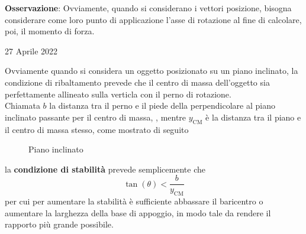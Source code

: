 \documentclass[a4paper]{extarticle}
\begin{document}
\vspace{1em}
\noindent
\textbf{Osservazione}: Ovviamente, quando si considerano i vettori posizione, bisogna considerare come loro punto di applicazione l'asse di rotazione al fine di calcolare, poi, il momento di forza.

\newpage
\noindent
\begin{center}
  27 Aprile 2022
\end{center}
Ovviamente quando si considera un oggetto posizionato su un piano inclinato, la condizione di ribaltamento prevede che il centro di massa dell'oggetto sia perfettamente allineato sulla verticla con il perno di rotazione.\\
Chiamata $b$ la distanza tra il perno e il piede della perpendicolare al piano inclinato passante per il centro di massa, , mentre $y_{\text{CM}}$ è la distanza tra il piano e il centro di massa stesso, come mostrato di seguito

\vspace{1em}
\noindent
\begin{figure}[H]
  \centering
  \newcommand{\ang}{30}

  \caption{Piano inclinato}
  \label{fig:piano_inclinato_1}
\end{figure}

\noindent
la \textbf{condizione di stabilità} prevede semplicemente che
\[\boxed{\tan(\theta) < \frac{b}{y_{\text{CM}}}}\]
per cui per aumentare la stabilità è sufficiente abbassare il baricentro o aumentare la larghezza della base di appoggio, in modo tale da rendere il rapporto più grande possibile.
\end{document}
